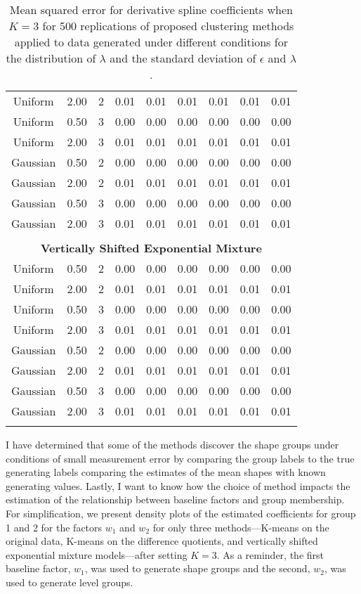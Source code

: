 \begin{table}[ht]
\begin{center}
\begin{tabular}{ccc|cccccc}
  Uniform & 2.00 &   2 & 0.01 & 0.01 & 0.01 & 0.01 & 0.01 & 0.01 \\ 
  Uniform & 0.50 &   3 & 0.00 & 0.00 & 0.00 & 0.00 & 0.00 & 0.00 \\ 
  Uniform & 2.00 &   3 & 0.01 & 0.01 & 0.01 & 0.01 & 0.01 & 0.01 \\ 
  Gaussian & 0.50 &   2 & 0.00 & 0.00 & 0.00 & 0.00 & 0.00 & 0.00 \\ 
  Gaussian & 2.00 &   2 & 0.01 & 0.01 & 0.01 & 0.01 & 0.01 & 0.01 \\ 
  Gaussian & 0.50 &   3 & 0.00 & 0.00 & 0.00 & 0.00 & 0.00 & 0.00 \\ 
  Gaussian & 2.00 &   3 & 0.01 & 0.01 & 0.01 & 0.01 & 0.01 & 0.01 \\ 
   \\ \multicolumn{9}{c}{\textbf{Vertically Shifted Exponential Mixture}}\\Uniform & 0.50 &   2 & 0.00 & 0.00 & 0.00 & 0.00 & 0.00 & 0.00 \\ 
  Uniform & 2.00 &   2 & 0.01 & 0.01 & 0.01 & 0.01 & 0.01 & 0.01 \\ 
  Uniform & 0.50 &   3 & 0.00 & 0.00 & 0.00 & 0.00 & 0.00 & 0.00 \\ 
  Uniform & 2.00 &   3 & 0.01 & 0.01 & 0.01 & 0.01 & 0.01 & 0.01 \\ 
  Gaussian & 0.50 &   2 & 0.00 & 0.00 & 0.00 & 0.00 & 0.00 & 0.00 \\ 
  Gaussian & 2.00 &   2 & 0.01 & 0.01 & 0.01 & 0.01 & 0.01 & 0.01 \\ 
  Gaussian & 0.50 &   3 & 0.00 & 0.00 & 0.00 & 0.00 & 0.00 & 0.00 \\ 
  Gaussian & 2.00 &   3 & 0.01 & 0.01 & 0.01 & 0.01 & 0.01 & 0.01 \\ 
   \thickhline\end{tabular}
\caption{Mean squared error for derivative spline coefficients when $K=3$ for 500 replications of proposed clustering methods applied to data generated under different conditions for the distribution of $\lambda$ and the standard deviation of $\epsilon$ and $\lambda$.}
\label{tab:mse3}
\end{center}
\end{table}
I have determined that some of the methods discover the shape groups under conditions of small measurement error by comparing the group labels to the true generating labels comparing the estimates of the mean shapes with known generating values. Lastly, I want to know how the choice of method impacts the estimation of the relationship between baseline factors and group membership. For simplification, we present density plots of the estimated coefficients for group 1 and 2 for the factors $w_{1}$ and $w_{2}$ for only three methods---K-means on the original data, K-means on the difference quotients, and vertically shifted exponential mixture models---after setting $K=3$. As a reminder, the first baseline factor, $w_{1}$, was used to generate shape groups and the second, $w_{2}$, was used to generate level groups. 

